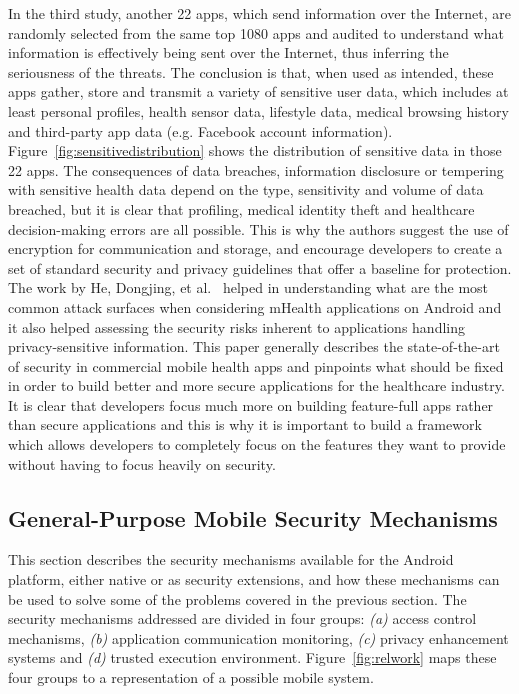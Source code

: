 In the third study, another 22 apps, which send information over the Internet, are randomly selected from the same top 1080 apps and audited to understand what information is effectively being sent over the Internet, thus inferring the seriousness of the threats. The conclusion is that, when used as intended, these apps gather, store and transmit a variety of sensitive user data, which includes at least personal profiles, health sensor data, lifestyle data, medical browsing history and third-party app data (e.g. Facebook account information). Figure~\ref{fig:sensitivedistribution} shows the distribution of sensitive data in those 22 apps. The consequences of data breaches, information disclosure or tempering with sensitive health data depend on the type, sensitivity and volume of data breached, but it is clear that profiling, medical identity theft and healthcare decision-making errors are all possible. This is why the authors suggest the use of encryption for communication and storage, and encourage developers to create a set of standard security and privacy guidelines that offer a baseline for protection.\\

The work by He, Dongjing, et al.~\cite{he2014security} helped in understanding what are the most common attack surfaces when considering mHealth applications on Android and it also helped assessing the security risks inherent to applications handling privacy-sensitive information. This paper generally describes the state-of-the-art of security in commercial mobile health apps and pinpoints what should be fixed in order to build better and more secure applications for the healthcare industry.
It is clear that developers focus much more on building feature-full apps rather than secure applications and this is why it is important to build a framework which allows developers to completely focus on the features they want to provide without having to focus heavily on security. 

\subsection{General-Purpose Mobile Security Mechanisms}

This section describes the security mechanisms available for the Android platform, either native or as security extensions, and how these mechanisms can be used to solve some of the problems covered in the previous section. The security mechanisms addressed are divided in four groups: \emph{(a)} access control mechanisms, \emph{(b)} application communication monitoring, \emph{(c)} privacy enhancement systems and \emph{(d)} trusted execution environment. Figure~\ref{fig:relwork} maps these four groups to a representation of a possible mobile system.

